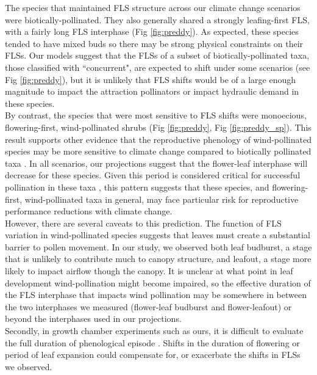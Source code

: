 \documentclass[12pt]{article}\usepackage[]{graphicx}\usepackage[]{color}
\begin{document}
\noindent The species that maintained FLS structure across our climate change scenarios were biotically-pollinated. They also generally shared a strongly leafing-first FLS, with a fairly long FLS interphase (Fig \ref{fig:preddy}). As expected, these species tended to have mixed buds so there may be strong physical constraints on their FLSs. Our models suggest that the FLSs of a subset of biotically-pollinated taxa, those classified with ``concurrent", are expected to shift under some scenarios (see Fig \ref{fig:preddy}), but  it is unlikely that FLS shifts would be of a large enough magnitude to impact the attraction pollinators or impact hydraulic demand in these species.\\

\noindent By contrast, the species that were most sensitive to FLS shifts were monoecious, flowering-first, wind-pollinated shrubs (Fig \ref{fig:preddy}, Fig \ref{fig:preddy_sp}). This result supports other evidence that the reproductive phenology of wind-pollinated species may be more sensitive to climate change compared to biotically pollinated taxa \citep{Ziello:2012aa}. In all scenarios, our projections suggest that the flower-leaf interphase will decrease for these species. Given this period is considered critical for successful pollination in these taxa \citep{Whitehead1969}, this pattern suggests that these species, and flowering-first, wind-pollinated taxa in general, may face particular risk for reproductive performance reductions with climate change.\\

\noindent However, there are several caveats to this prediction. The function of FLS variation in wind-pollinated species suggests that leaves must create a substantial barrier to pollen movement. In our study, we observed both leaf budburst, a stage that is unlikely to contribute much to canopy structure, and leafout, a stage more likely to impact airflow though the canopy. It is unclear at what point in leaf development wind-pollination might become impaired, so the effective duration of the FLS interphase that impacts wind pollination may be somewhere in between the two interphases we measured (flower-leaf budburst and flower-leafout) or beyond the interphases used in our projections.\\

\noindent Secondly, in growth chamber experiments such as ours, it is difficult to evaluate the full duration of  phenological episode \citep{Primack2015}. Shifts in the duration of flowering or period of leaf expansion could compensate for, or exacerbate the shifts in FLSs we observed.\\ 
\end{document}
